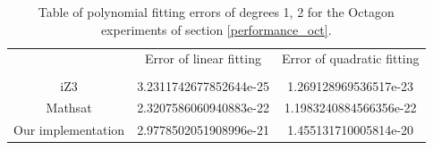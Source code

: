 \begin{table}[h]
  \centering
  \begin{tabular}{ccc}
    \toprule
    {}                 & Error of linear fitting & Error of quadratic fitting \\
    \cmidrule{2-2} \cmidrule{3-3} \\
    iZ3                & 3.2311742677852644e-25 & 1.269128969536517e-23       \\
    Mathsat            & 2.3207586060940883e-22 & 1.1983240884566356e-22      \\
    Our implementation & 2.9778502051908996e-21 & 1.455131710005814e-20       \\
    \bottomrule
  \end{tabular}
  \caption{Table of polynomial fitting errors of degrees 1, 2 for the
  Octagon experiments of section \ref{performance_oct}.}
\end{table}

